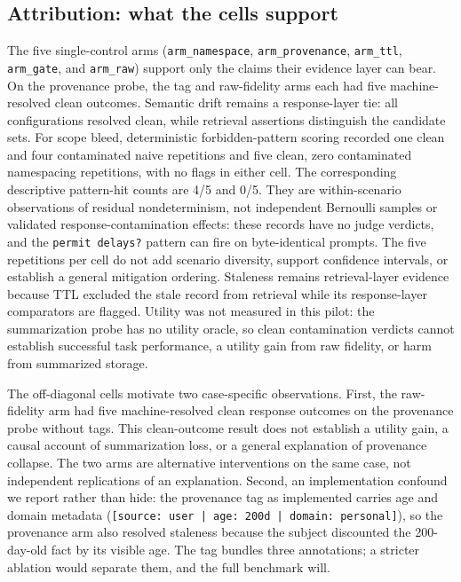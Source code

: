 \documentclass[11pt]{article}
\begin{document}
\subsection{Attribution: what the cells support}

The five single-control arms (\texttt{arm\_namespace},
\texttt{arm\_provenance}, \texttt{arm\_ttl}, \texttt{arm\_gate}, and
\texttt{arm\_raw}) support only the claims their evidence layer can bear. On
the provenance probe, the tag and raw-fidelity arms each had five
machine-resolved clean outcomes. Semantic drift remains a response-layer tie:
all configurations resolved clean, while retrieval assertions distinguish the
candidate sets. For scope bleed, deterministic forbidden-pattern scoring
recorded one clean and four contaminated naive repetitions and five clean,
zero contaminated namespacing repetitions, with no flags in either cell. The
corresponding descriptive pattern-hit counts are 4/5 and 0/5. They are
within-scenario observations of residual nondeterminism, not independent
Bernoulli samples or validated response-contamination effects: these records
have no judge verdicts, and the \texttt{permit delays?} pattern can fire on
byte-identical prompts. The five repetitions per cell do not add scenario
diversity, support confidence intervals, or establish a general mitigation
ordering.
Staleness remains retrieval-layer evidence because TTL excluded the stale
record from retrieval while its response-layer comparators are flagged.
Utility was not measured in this pilot: the summarization probe has no utility
oracle, so clean contamination verdicts cannot establish successful task
performance, a utility gain from raw fidelity, or harm from summarized storage.

The off-diagonal cells motivate two case-specific observations. First, the
raw-fidelity arm had five machine-resolved clean response outcomes on the
provenance probe without tags. This clean-outcome result does not establish a
utility gain, a causal account of summarization loss, or a general explanation
of provenance collapse. The two arms are alternative interventions on the same
case, not independent replications of an explanation.
Second, an implementation
confound we report rather than hide: the provenance tag as implemented
carries age and domain metadata (\texttt{[source: user | age: 200d |
domain: personal]}), so the provenance arm also resolved staleness because
the subject discounted the 200-day-old fact by its visible age. The tag
bundles three annotations; a stricter ablation would separate them, and
the full benchmark will.
\end{document}
